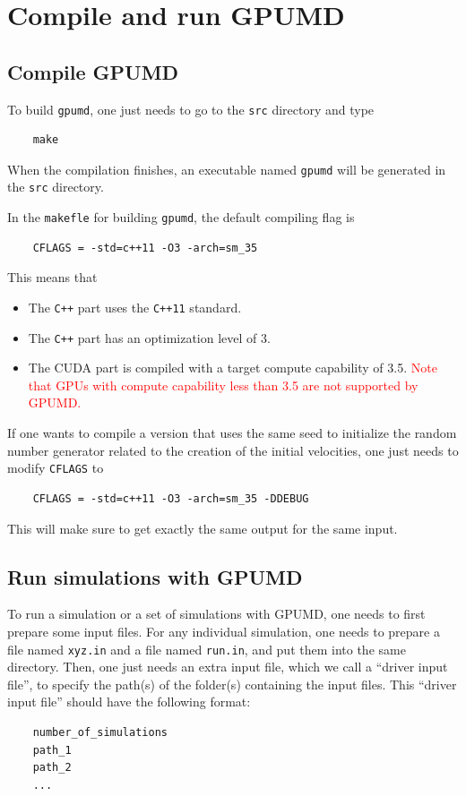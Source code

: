 \documentclass[12pt,a4paper]{report}
\begin{document}
\section{Compile and run GPUMD}

\subsection{Compile GPUMD}


To build \verb"gpumd", one just needs to go to the \verb"src" directory and type 
\begin{verbatim}
    make
\end{verbatim}
When the compilation finishes, an executable named \verb"gpumd" will be generated in the \verb"src" directory.

In the \verb"makefle" for building \verb"gpumd", the default compiling flag is
\begin{verbatim}
    CFLAGS = -std=c++11 -O3 -arch=sm_35
\end{verbatim}
This means that
\begin{itemize}
\item The \verb"C++" part uses the \verb"C++11" standard.
\item The \verb"C++" part has an optimization level of 3.
\item The CUDA part is compiled with a target compute capability of 3.5. \textcolor{red}{Note that GPUs with compute capability less than 3.5 are not supported by GPUMD.}
\end{itemize}

If one wants to compile a version that
uses the same seed to initialize the random number generator related to the creation of the initial velocities, one just needs to modify \verb"CFLAGS" to
\begin{verbatim}
    CFLAGS = -std=c++11 -O3 -arch=sm_35 -DDEBUG
\end{verbatim}
This will make sure to get exactly the same output for the same input.

\subsection{Run simulations with GPUMD}

To run a simulation or a set of simulations with GPUMD, one needs to first prepare some input files. For any individual simulation, one needs to prepare a file named \verb"xyz.in" and a file named \verb"run.in", and put them into the same directory. Then, one just needs an extra input file, which we call a ``driver input file'', to specify the path(s) of the folder(s) containing the input files. This ``driver input file'' should have the following format:
\begin{verbatim}
    number_of_simulations
    path_1
    path_2
    ...
\end{verbatim}
\end{document}
